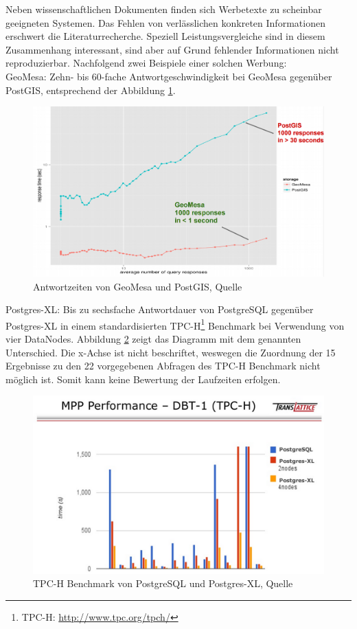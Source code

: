 Neben wissenschaftlichen Dokumenten finden sich Werbetexte zu scheinbar geeigneten Systemen.
Das Fehlen von verlässlichen konkreten Informationen erschwert die Literaturrecherche.
Speziell Leistungsvergleiche sind in diesem Zusammenhang interessant, sind aber auf Grund fehlender Informationen nicht reproduzierbar.
Nachfolgend zwei Beispiele einer solchen Werbung:\\
GeoMesa: Zehn- bis 60-fache Antwortgeschwindigkeit bei GeoMesa gegenüber PostGIS, entsprechend der Abbildung \ref{fig:geomesaversuspostgis}.
\begin{figure}[hp]
\centering
\includegraphics[width=.8\textwidth]{Abbildungen/geomesa_versus_postgis.png}
\caption[Antwortzeiten von GeoMesa und PostGIS]{Antwortzeiten von GeoMesa und PostGIS, Quelle \cite[S.24]{website:slideshare:geomesa}}
\label{fig:geomesaversuspostgis}
\end{figure}

Postgres-XL: Bis zu sechsfache Antwortdauer von PostgreSQL gegenüber Postgres-XL in einem standardisierten TPC-H\footnote{TPC-H: \url{http://www.tpc.org/tpch/}} Benchmark bei Verwendung von vier DataNodes. Abbildung \ref{fig:pgxcversuspgsql} zeigt das Diagramm mit dem genannten Unterschied.
Die x-Achse ist nicht beschriftet, weswegen die Zuordnung der 15 Ergebnisse zu den 22 vorgegebenen Abfragen des TPC-H Benchmark nicht möglich ist.
Somit kann keine Bewertung der Laufzeiten erfolgen.
\begin{figure}
\centering
\includegraphics[width=.8\textwidth]{Abbildungen/postgresxl_versus_postgis.png}
\caption[TPC-H Benchmark von PostgreSQL und Postgres-XL]{TPC-H Benchmark von PostgreSQL und Postgres-XL, Quelle \cite[S.12]{website:slideshare:pgxc}}
\label{fig:pgxcversuspgsql}
\end{figure}

